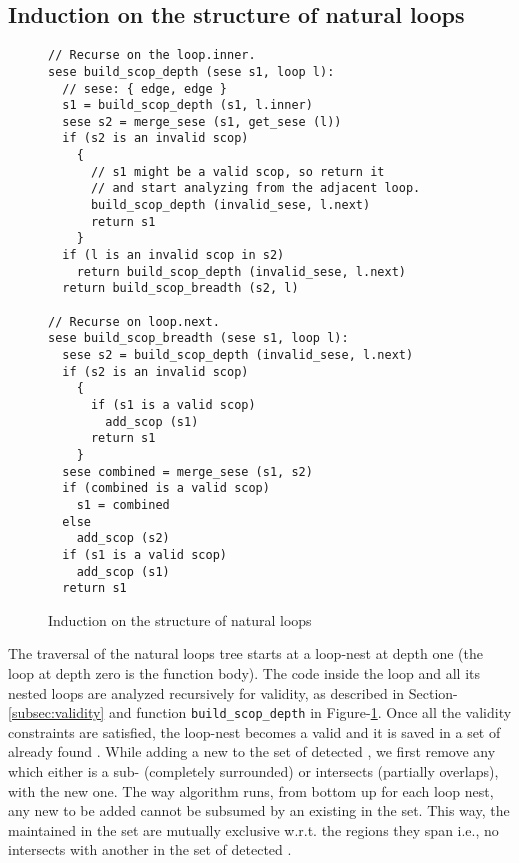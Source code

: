 \documentclass{sig-alternate}
\begin{document}
\subsection{Induction on the structure of natural loops}
\label{subsec:induction}

\begin{figure}
\begin{verbatim}
// Recurse on the loop.inner.
sese build_scop_depth (sese s1, loop l):
  // sese: { edge, edge }
  s1 = build_scop_depth (s1, l.inner)
  sese s2 = merge_sese (s1, get_sese (l))
  if (s2 is an invalid scop)
    {
      // s1 might be a valid scop, so return it
      // and start analyzing from the adjacent loop.
      build_scop_depth (invalid_sese, l.next)
      return s1
    }
  if (l is an invalid scop in s2)
    return build_scop_depth (invalid_sese, l.next)
  return build_scop_breadth (s2, l)

// Recurse on loop.next.
sese build_scop_breadth (sese s1, loop l):
  sese s2 = build_scop_depth (invalid_sese, l.next)
  if (s2 is an invalid scop)
    {
      if (s1 is a valid scop)
        add_scop (s1)
      return s1
    }
  sese combined = merge_sese (s1, s2)
  if (combined is a valid scop)
    s1 = combined
  else
    add_scop (s2)
  if (s1 is a valid scop)
    add_scop (s1)
  return s1
\end{verbatim}
\caption{Induction on the structure of natural loops}
\label{fig:induction}
\end{figure}

The traversal of the natural loops tree starts at a loop-nest at depth one
(the loop at depth zero is the function body).
The code inside the loop and all its nested loops are analyzed recursively for
validity, as described in Section-\ref{subsec:validity} and
function \texttt{build\_scop\_depth} in
Figure-\ref{fig:induction}.  Once all the validity constraints are satisfied,
the loop-nest becomes a valid \SCoP{} and it is saved in a set of
already found . While adding a new \SCoP{} to the set of detected , we
first remove any \SCoP{} which either is a sub-\SCoP{} (completely surrounded) or
intersects (partially overlaps), with the new one. The way algorithm runs, from
bottom up for each loop nest, any new \SCoP{} to be added cannot be subsumed by an
existing \SCoP{} in the set. This way, the  maintained in the set are
mutually exclusive w.r.t. the regions they span i.e., no \SCoP{} intersects with
another in the set of detected .
\end{document}
